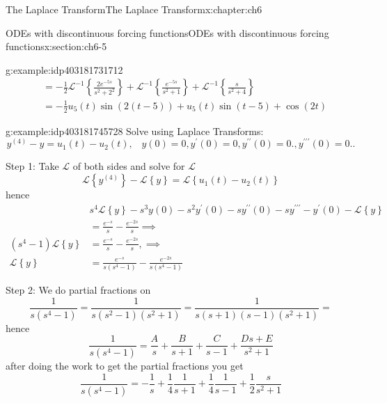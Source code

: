 \documentclass[oneside,10pt,]{book}
\numberwithin{equation}{section}
\numberwithin{equation}{section}
\newcommand{\amp}{&}
\begin{document}
\begin{chapterptx}{The Laplace Transform}{}{The Laplace Transform}{}{}{x:chapter:ch6}
\begin{sectionptx}{ODEs with discontinuous forcing functions}{}{ODEs with discontinuous forcing functions}{}{}{x:section:ch6-5}
\begin{example}{}{g:example:idp403181731712}
\begin{align*}
\amp =-\frac{1}{2}\mathcal{L}^{-1}\left\{ \frac{2e^{-5s}}{s^{2}+2^{2}}\right\} +\mathcal{L}^{-1}\left\{ \frac{e^{-5s}}{s^{2}+1}\right\} +\mathcal{L}^{-1}\left\{ \frac{s}{s^{2}+4}\right\} \\
\amp =-\frac{1}{2}u_{5}(t)\sin\left(2\left(t-5\right)\right)+u_{5}(t)\sin\left(t-5\right)+\cos\left(2t\right)
\end{align*}
%
\end{example}
\begin{example}{}{g:example:idp403181745728}%
Solve using Laplace Transforms:%
\begin{equation*}
y^{(4)}-y=u_{1}(t)-u_{2}(t),\,\,\,\,\,y(0)=0,y^{\prime}(0)=0,y^{\prime\prime}(0)=0.,y^{\prime\prime\prime}(0)=0..
\end{equation*}
%
\par
Step 1: Take \(\mathcal{L}\) of both sides and solve for \(\mathcal{L}\)%
\begin{equation*}
\mathcal{L}\left\{ y^{(4)}\right\} -\mathcal{L}\left\{ y\right\} =\mathcal{L}\left\{ u_{1}(t)-u_{2}(t)\right\} 
\end{equation*}
hence%
\begin{align*}
\amp s^{4}\mathcal{L}\left\{ y\right\} -s^{3}y(0)-s^{2}y^{\prime}(0)-sy^{\prime\prime}(0)-sy^{\prime\prime\prime}-y^{\prime}(0)-\mathcal{L}\left\{ y\right\}\\
\amp =\frac{e^{-s}}{s}-\frac{e^{-2s}}{s}\implies\\
\left(s^{4}-1\right)\mathcal{L}\left\{ y\right\}  \amp =\frac{e^{-s}}{s}-\frac{e^{-2s}}{s},\implies\\
\mathcal{L}\left\{ y\right\}  \amp =\frac{e^{-s}}{s\left(s^{4}-1\right)}-\frac{e^{-2s}}{s\left(s^{4}-1\right)}
\end{align*}
%
\par
Step 2: We do partial fractions on%
\begin{equation*}
\frac{1}{s\left(s^{4}-1\right)}=\frac{1}{s\left(s^{2}-1\right)\left(s^{2}+1\right)}=\frac{1}{s\left(s+1\right)\left(s-1\right)\left(s^{2}+1\right)}=
\end{equation*}
hence%
\begin{equation*}
\frac{1}{s\left(s^{4}-1\right)}=\frac{A}{s}+\frac{B}{s+1}+\frac{C}{s-1}+\frac{Ds+E}{s^{2}+1}
\end{equation*}
after doing the work to get the partial fractions you get%
\begin{equation*}
\frac{1}{s\left(s^{4}-1\right)}=-\frac{1}{s}+\frac{1}{4}\frac{1}{s+1}+\frac{1}{4}\frac{1}{s-1}+\frac{1}{2}\frac{s}{s^{2}+1}

\end{equation*}
\end{example}
\end{sectionptx}
\end{chapterptx}
\end{document}

